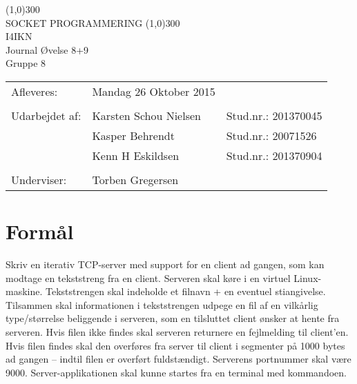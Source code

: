 \documentclass{article}
\begin{document}
\begin{titlepage}
\begin{center}
\line(1,0){300}\\
[0.25in]
\huge{SOCKET PROGRAMMERING} 											%
\line(1,0){300}\\
[1cm]
\huge{I4IKN\\ Journal Øvelse 8+9} \\
Gruppe 8\\ %
[3cm]

\large
\begin{tabular}{l l l}
Afleveres: 		& Mandag 26 Oktober 2015 & 						\\ 		%
																\\
Udarbejdet af:  & Karsten Schou Nielsen  & Stud.nr.: 201370045  \\
				& Kasper Behrendt		 & Stud.nr.: 20071526   \\
				& Kenn H Eskildsen 		 & Stud.nr.: 201370904  \\
																\\
Underviser:		& Torben Gregersen 								\\		%

\end{tabular}
\end{center}
\end{titlepage}

\newpage
\tableofcontents
\thispagestyle{empty}
\cleardoublepage
\setcounter{page}{1}
\newpage
\section{Formål}

Skriv en iterativ TCP-server med support for en client ad gangen, som kan modtage
en tekststreng fra en client. Serveren skal køre i en virtuel Linux-maskine.
Tekststrengen skal indeholde et filnavn + en eventuel stiangivelse. Tilsammen skal
informationen i tekststrengen udpege en fil af en vilkårlig type/størrelse beliggende i
serveren, som en tilsluttet client ønsker at hente fra serveren. Hvis filen ikke findes
skal serveren returnere en fejlmelding til client’en. Hvis filen findes skal den overføres
fra server til client i segmenter på 1000 bytes ad gangen – indtil filen er overført
fuldstændigt. Serverens portnummer skal være 9000. Server-applikationen skal
kunne startes fra en terminal med kommandoen.\\
\end{document}
